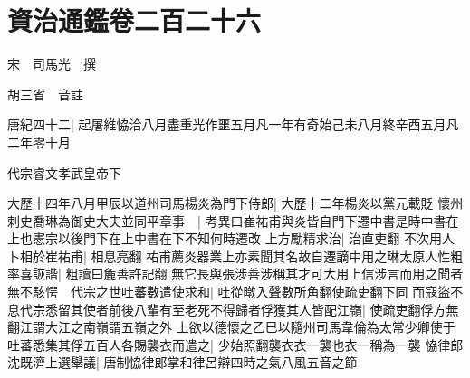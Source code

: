\section{資治通鑑卷二百二十六}
宋　司馬光　撰

胡三省　音註

唐紀四十二|{
	起屠維恊洽八月盡重光作噩五月凡一年有奇始己未八月終辛酉五月凡二年零十月}


代宗睿文孝武皇帝下

大歷十四年八月甲辰以道州司馬楊炎為門下侍郎|{
	大歷十二年楊炎以黨元載貶}
懷州刺史喬琳為御史大夫並同平章事　|{
	考異曰崔祐甫與炎皆自門下遷中書是時中書在上也憲宗以後門下在上中書在下不知何時遷改}
上方勵精求治|{
	治直吏翻}
不次用人卜相於崔祐甫|{
	相息亮翻}
祐甫薦炎器業上亦素聞其名故自遷謫中用之琳太原人性粗率喜詼諧|{
	粗讀曰麁善許記翻}
無它長與張涉善涉稱其才可大用上信涉言而用之聞者無不駭愕　代宗之世吐蕃數遣使求和|{
	吐從暾入聲數所角翻使疏吏翻下同}
而寇盜不息代宗悉留其使者前後八輩有至老死不得歸者俘獲其人皆配江嶺|{
	使疏吏翻俘方無翻江謂大江之南嶺謂五嶺之外}
上欲以德懷之乙巳以隨州司馬韋倫為太常少卿使于吐蕃悉集其俘五百人各賜襲衣而遣之|{
	少始照翻襲衣衣一襲也衣一稱為一襲}
恊律郎沈既濟上選舉議|{
	唐制恊律郎掌和律呂辯四時之氣八風五音之節}


